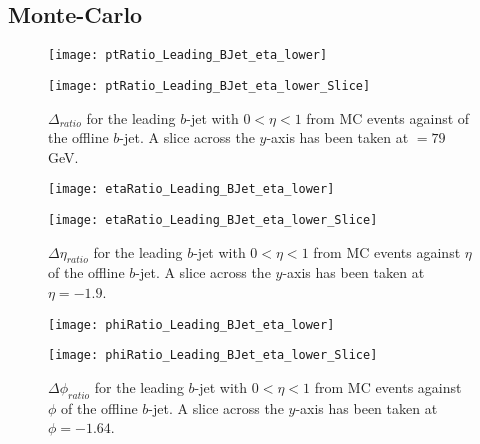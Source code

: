 	\subsection{Monte-Carlo}

		\begin{figure}[h]
			\centering
			\begin{minipage}[h]{0.33\linewidth}
				\texttt{[image: ptRatio\_Leading\_BJet\_eta\_lower]}

			\end{minipage}
			\quad
			\begin{minipage}[h]{0.33\linewidth}
				\texttt{[image: ptRatio\_Leading\_BJet\_eta\_lower\_Slice]}
			\end{minipage}
			\caption{$\Delta $\pt$_{ratio}$ for the leading \pt $b$-jet with $0 < \eta < 1$ from MC events against \pt of the offline $b$-jet. A slice across the $y$-axis has been taken at \pt$=79$GeV. }
			\label{fig:MC:leadingbptcentral}
		\end{figure}

		\begin{figure}[h]
			\centering

			\begin{minipage}[h]{0.33\linewidth}
				\texttt{[image: etaRatio\_Leading\_BJet\_eta\_lower]}
			\end{minipage}
			\quad
			\begin{minipage}[h]{0.33\linewidth}
				\texttt{[image: etaRatio\_Leading\_BJet\_eta\_lower\_Slice]}
			\end{minipage}
			\caption{$\Delta \eta_{ratio}$ for the leading \pt $b$-jet with $0 < \eta < 1$ from MC events against $\eta$ of the offline $b$-jet. A slice across the $y$-axis has been taken at $\eta=-1.9$. }
			\label{fig:MC:leadingbetacentral}
		\end{figure}

		\begin{figure}[h]
			\centering

			\begin{minipage}[h]{0.33\linewidth}
				\texttt{[image: phiRatio\_Leading\_BJet\_eta\_lower]}
			\end{minipage}
			\quad
			\begin{minipage}[h]{0.33\linewidth}
				\texttt{[image: phiRatio\_Leading\_BJet\_eta\_lower\_Slice]}
			\end{minipage}
			\caption{$\Delta \phi_{ratio}$ for the leading \pt $b$-jet with $0 < \eta < 1$ from MC events against $\phi$ of the offline $b$-jet. A slice across the $y$-axis has been taken at $\phi=-1.64$. }
			\label{fig:MC:leadingbphicentral}
		\end{figure}

